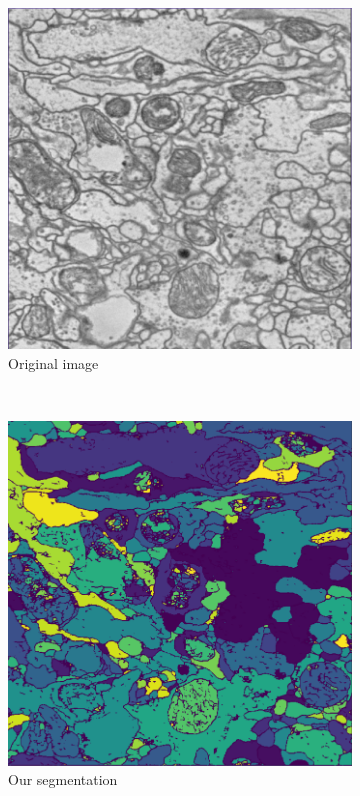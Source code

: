 \begin{figure}[!htbp]
    \centering
    \begin{subfigure}[t]{0.31\textwidth}
        \centering
        \includegraphics[height=0.7\textwidth]{./images/cremi_orig_2.png}
        \caption{Original image}
    \end{subfigure}%
    ~ 
    \begin{subfigure}[t]{0.31\textwidth}
        \centering
        \includegraphics[height=0.7\textwidth]{./images/cremi_out_2.png}
        \caption{Our segmentation}
    \end{subfigure}
    ~ 
    \begin{subfigure}[t]{0.31\textwidth}
        \centering

\end{subfigure}
\end{figure}
